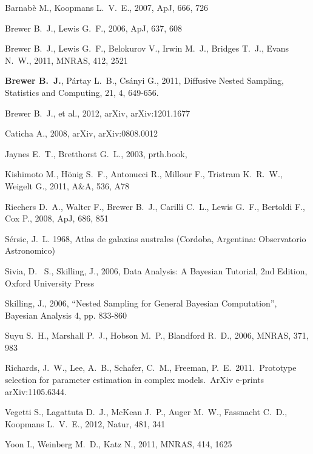 \documentclass[letterpaper, 11pt]{article}
\begin{document}
\begin{thebibliography}{99}
 Barnab{\`e} M., Koopmans L.~V.~E., 2007, ApJ, 666, 726 

 Brewer B.~J., Lewis G.~F., 2006, ApJ, 637, 608 

Brewer B.~J., Lewis G.~F., Belokurov V., Irwin M.~J., Bridges T.~J., Evans 
N.~W., 2011, MNRAS, 412, 2521 

 {\bf Brewer B.~J.}, P{\'a}rtay L.~B., Cs{\'a}nyi G., 2011, Diffusive Nested Sampling, 
Statistics and Computing, 21, 4, 649-656.

Brewer B.~J., et al., 2012, arXiv, arXiv:1201.1677 

Caticha A., 2008, arXiv, arXiv:0808.0012 

 Jaynes E.~T., Bretthorst G.~L., 2003, prth.book,  

 Kishimoto M., H{\"o}nig S.~F., Antonucci R., Millour F., Tristram K.~R.~W., Weigelt G., 2011, A\&A, 536, A78 

 Riechers D.~A., Walter F., Brewer B.~J., 
Carilli C.~L., Lewis G.~F., Bertoldi F., Cox P., 2008, ApJ, 686, 851 

{S{\'e}rsic}, J.~L. 1968, {Atlas de galaxias australes} (Cordoba, Argentina:
  Observatorio Astronomico)


 Sivia, 
D.~ S., Skilling, J., 2006, Data Analysis: A Bayesian Tutorial, 2nd 
Edition, Oxford University Press

 Skilling, 
J., 2006, ``Nested Sampling for General Bayesian Computation'', Bayesian 
Analysis 4, pp. 833-860

Suyu S.~H., Marshall P.~J., Hobson M.~P., Blandford R.~D., 2006, MNRAS, 
371, 983 

 Richards, J.~W., Lee, 
A.~B., Schafer, C.~M., Freeman, P.~E.\ 2011.\ Prototype selection for 
parameter estimation in complex models.\ ArXiv e-prints arXiv:1105.6344. 

 Vegetti S., Lagattuta D.~J., McKean J.~P., 
Auger M.~W., Fassnacht C.~D., Koopmans L.~V.~E., 2012, Natur, 481, 341 

 Yoon I., Weinberg M.~D., Katz N., 2011, MNRAS, 414, 1625 
\end{thebibliography}
\end{document}
